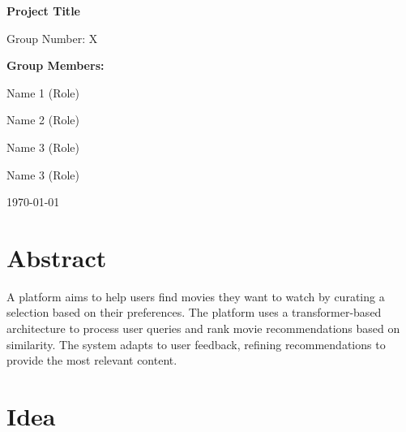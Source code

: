 \documentclass[11pt,a4paper]{article}
\begin{document}
  \begin{titlepage}
    \begin{center}
      \vspace*{2cm}
      {\huge\bfseries Project Title\par}
      \vspace{2cm}
      {\Large Group Number: X\par}
      \vspace{1.5cm}
      {\large\bfseries Group Members:\par}
      \vspace{0.5cm}
      {\large
      Name 1 (Role)\par
      Name 2 (Role)\par
      Name 3 (Role)\par
      Name 3 (Role)\par
      }
      \vfill
      {\large \today\par}
    \end{center}
  \end{titlepage}

  \tableofcontents
  \newpage

  \section{Abstract}

  A platform aims to help users find movies they want to watch by curating a selection based on their preferences.
  The platform uses a transformer-based architecture to process user queries and rank movie recommendations based on similarity.
  The system adapts to user feedback, refining recommendations to provide the most relevant content.

  \section{Idea}
\end{document}
